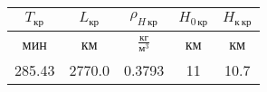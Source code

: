 \begin{tabular}{|c|c|c|c|c|}
\hline
$T_{кр}$ & $L_{кр}$ & $\rho_{H\, кр}$ & $H_{0\, кр}$ & $H_{к\, кр}$ \\ 
\hline
мин & км & $\frac{кг}{м^3}$ & км & км \\ 
\hline
285.43 & 2770.0 & 0.3793 & 11 & 10.7 \\ 
\hline
\end{tabular}